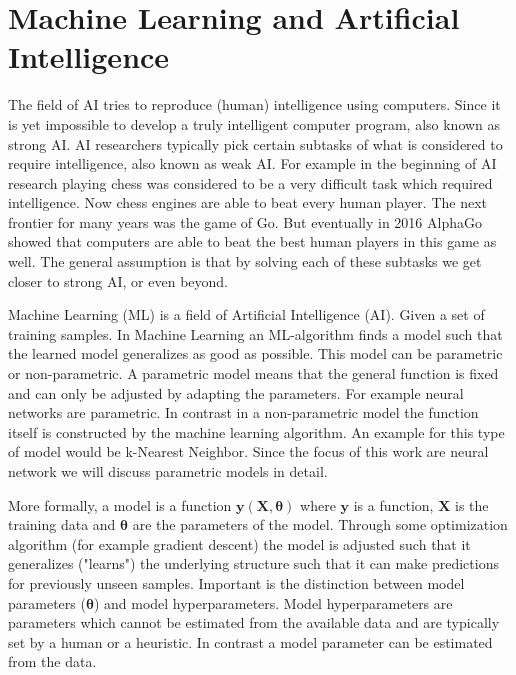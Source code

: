 \documentclass[draft,final,oneside]{vutinfth} %
\begin{document}
\section{Machine Learning and Artificial Intelligence}
 The field of AI tries to reproduce (human) intelligence using computers. Since it is yet impossible to develop a truly intelligent computer program, also known as strong AI. AI researchers typically pick certain subtasks of what is considered to require intelligence, also known as weak AI. For example in the beginning of AI research playing chess was considered to be a very difficult task which required intelligence. Now chess engines are able to beat every human player. The next frontier for many years was the game of Go. But eventually in 2016 AlphaGo showed that computers are able to beat the best human players in this game as well. The general assumption is that by solving each of these subtasks we get closer to strong AI, or even beyond.


Machine Learning (ML) is a field of Artificial Intelligence (AI). Given a set of training samples. In Machine Learning an ML-algorithm finds a model such that the learned model generalizes as good as possible. This model can be parametric or non-parametric. A parametric model means that the general function is fixed and can only be adjusted by adapting the parameters. For example neural networks are parametric. In contrast in a non-parametric model the function itself is constructed by the machine learning algorithm. An example for this type of model would be k-Nearest Neighbor. Since the focus of this work are neural network we will discuss parametric models in detail.

More formally, a model is a function $\boldsymbol{y}(\boldsymbol{X}, \boldsymbol{\theta})$ where $\boldsymbol{y}$ is a function, $\boldsymbol{X}$ is the training data and $\boldsymbol{\theta}$ are the parameters of the model. Through some optimization algorithm (for example gradient descent) the model is adjusted such that it generalizes ("learns") the underlying structure such that it can make predictions for previously unseen samples. Important is the distinction between model parameters ($\boldsymbol{\theta}$) and model hyperparameters. Model hyperparameters are parameters which cannot be estimated from the available data and are typically set by a human or a heuristic. In contrast a model parameter can be estimated from the data.
\end{document}
